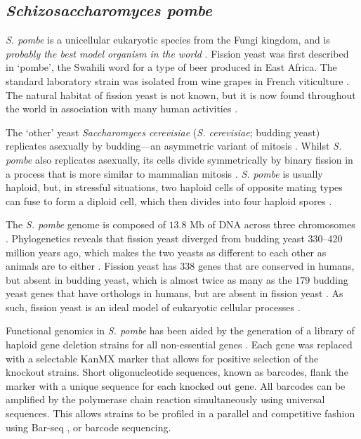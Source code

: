 \subsection{\emph{Schizosaccharomyces pombe}}

\emph{S. pombe} is a unicellular eukaryotic species from the Fungi kingdom, and is \emph{probably the best model organism in the world} \cite{Bahler2006}. Fission yeast was first described in `pombe', the Swahili word for a type of beer produced in East Africa. The standard laboratory strain was isolated from wine grapes in French viticulture \cite{Jeffares2015}. The natural habitat of fission yeast is not known, but it is now found throughout the world in association with many human activities \cite{Jeffares2015}.

The `other' yeast \emph{Saccharomyces cerevisiae} (\emph{S. cerevisiae}; budding yeast) replicates asexually by budding---an asymmetric variant of mitosis \cite{Goffeau1996}. Whilst \emph{S. pombe} also replicates asexually, its cells divide symmetrically by binary fission in a process that is more similar to mammalian mitosis \cite{Hoffman2015}. \emph{S. pombe} is usually haploid, but, in stressful situations, two haploid cells of opposite mating types can fuse to form a diploid cell, which then divides into four haploid spores \cite{Egel1989}.

The \emph{S. pombe} genome is composed of $13.8$ Mb of DNA across three chromosomes \cite{Wood2002}. Phylogenetics reveals that fission yeast diverged from budding yeast \numrange{330}{420} million years ago, which makes the two yeasts as different to each other as animals are to either \cite{Sipiczki2000}. Fission yeast has $338$ genes that are conserved in humans, but absent in budding yeast, which is almost twice as many as the $179$ budding yeast genes that have orthologs in humans, but are absent in fission yeast \cite{Hoffman2015}. As such, fission yeast is an ideal model of eukaryotic cellular processes \cite{Nurse1976}.

Functional genomics in \emph{S. pombe} has been aided by the generation of a library of haploid gene deletion strains for all non-essential genes \cite{Kim2010}. Each gene was replaced with a selectable KanMX marker that allows for positive selection of the knockout strains. Short oligonucleotide sequences, known as barcodes, flank the marker with a unique sequence for each knocked out gene. All barcodes can be amplified by the polymerase chain reaction simultaneously using universal sequences. This allows strains to be profiled in a parallel and competitive fashion using Bar-seq \cite{Han2010,Smith2009}, or barcode sequencing.

